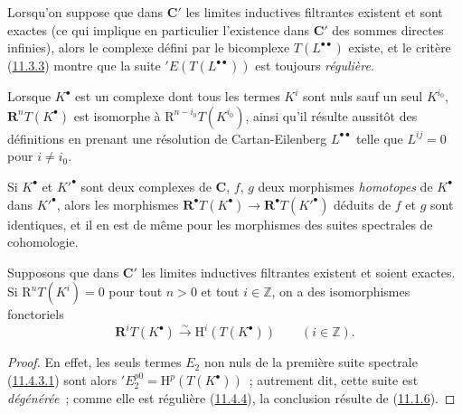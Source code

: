 \begin{env}[11.4.3]
Lorsqu'on suppose que dans $\boldsymbol{C}'$ les limites inductives filtrantes
existent et sont exactes (ce qui implique en particulier l'existence dans
$\boldsymbol{C}'$ des sommes directes infinies), alors le complexe défini par le
bicomplexe $T(L^{\bullet\bullet})$ existe, et le critère
(\hyperref[0.11.3.3-fr]{11.3.3}) montre que la suite
$'E(T(L^{\bullet\bullet}))$ est toujours \emph{régulière}.

Lorsque $K^\bullet$ est un complexe dont tous les termes $K^i$ sont nuls sauf
un seul $K^{i_0}$, $\mathbf R^nT(K^\bullet)$ est isomorphe à
$\mathrm R^{n-i_0}T(K^{i_0})$, ainsi qu'il résulte aussitôt des définitions en
prenant une résolution de Cartan-Eilenberg $L^{\bullet\bullet}$ telle que
$L^{ij}=0$ pour $i\neq i_0$.

Si $K^\bullet$ et $K'^\bullet$ sont deux complexes de $\boldsymbol{C}$, $f$, $g$
deux morphismes \emph{homotopes} de $K^\bullet$ dans $K'^\bullet$, alors les
morphismes $\mathbf R^\bullet T(K^\bullet)\to
\mathbf R^\bullet T(K'^\bullet)$ déduits de $f$ et $g$ sont identiques, et il
en est de même pour les morphismes des suites spectrales de cohomologie.
\end{env}

\begin{proposition}[11.4.5]
\label{0.11.4.5-fr}
Supposons que dans $\boldsymbol{C}'$ les limites inductives filtrantes existent et
soient exactes. Si $\mathrm R^nT(K^i)=0$ pour tout $n>0$ et tout
$i\in\mathbb Z$, on a des isomorphismes fonctoriels
\[
  \label{0.11.4.5.1-fr}
  \mathbf R^iT(K^\bullet)\xrightarrow{\sim}
  \mathrm H^i(T(K^\bullet))\qquad(i\in\mathbb Z).
  \tag{11.4.5.1}
\]
\end{proposition}

\begin{proof}
En effet, les seuls termes $E_2$ non nuls de la première suite spectrale
(\hyperref[0.11.4.3.1-fr]{11.4.3.1}) sont alors
$'E_2^{p0}=\mathrm H^p(T(K^\bullet))$~; autrement dit, cette suite est
\emph{dégénérée}~; comme elle est régulière
(\hyperref[0.11.4.4-fr]{11.4.4}), la conclusion résulte de
(\hyperref[0.11.1.6-fr]{11.1.6}).
\end{proof}

